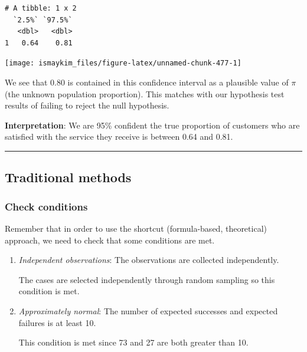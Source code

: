 \documentclass[12pt,]{krantz}
\makeatletter
\newenvironment{Shaded}{\begin{snugshade}}{\end{snugshade}}
\newcommand{\KeywordTok}[1]{\textcolor[rgb]{0.27,0.27,0.27}{\textbf{#1}}}
\newcommand{\DataTypeTok}[1]{\textcolor[rgb]{0.27,0.27,0.27}{#1}}
\newcommand{\StringTok}[1]{\textcolor[rgb]{0.5,0.5,0.5}{#1}}
\newcommand{\OperatorTok}[1]{\textcolor[rgb]{0.43,0.43,0.43}{\textbf{#1}}}
\newcommand{\NormalTok}[1]{#1}
\newenvironment{kframe}{%
\medskip{}
\setlength{\fboxsep}{.8em}
 \def\at@end@of@kframe{}%
 \ifinner\ifhmode%
  \def\at@end@of@kframe{\end{minipage}}%
  \begin{minipage}{\columnwidth}%
 \fi\fi%
 \def\FrameCommand##1{\hskip\@totalleftmargin \hskip-\fboxsep
 \colorbox{shadecolor}{##1}\hskip-\fboxsep
     \hskip-\linewidth \hskip-\@totalleftmargin \hskip\columnwidth}%
 \MakeFramed {\advance\hsize-\width
   \@totalleftmargin\z@ \linewidth\hsize
   \@setminipage}}%
 {\par\unskip\endMakeFramed%
 \at@end@of@kframe}
\renewenvironment{Shaded}{\begin{kframe}}{\end{kframe}}
\theoremstyle{definition}
\theoremstyle{definition}
\theoremstyle{definition}
\theoremstyle{remark}
\makeatother
\begin{document}
\begin{verbatim}
# A tibble: 1 x 2
  `2.5%` `97.5%`
   <dbl>   <dbl>
1   0.64    0.81
\end{verbatim}

\begin{Shaded}
\end{Shaded}

\begin{center}\texttt{[image: ismaykim\_files/figure-latex/unnamed-chunk-477-1]} \end{center}

We see that 0.80 is contained in this confidence interval as a plausible
value of \(\pi\) (the unknown population proportion). This matches with
our hypothesis test results of failing to reject the null hypothesis.

\textbf{Interpretation}: We are 95\% confident the true proportion of
customers who are satisfied with the service they receive is between
0.64 and 0.81.

\begin{center}\rule{0.5\linewidth}{\linethickness}\end{center}

\subsection{Traditional methods}\label{traditional-methods-1}

\subsubsection*{Check conditions}\label{check-conditions-1}


Remember that in order to use the shortcut (formula-based, theoretical)
approach, we need to check that some conditions are met.

\begin{enumerate}
\def\labelenumi{\arabic{enumi}.}
\item
  \emph{Independent observations}: The observations are collected
  independently.

  The cases are selected independently through random sampling so this
  condition is met.
\item
  \emph{Approximately normal}: The number of expected successes and
  expected failures is at least 10.

  This condition is met since 73 and 27 are both greater than 10.
\end{enumerate}
\end{document}
